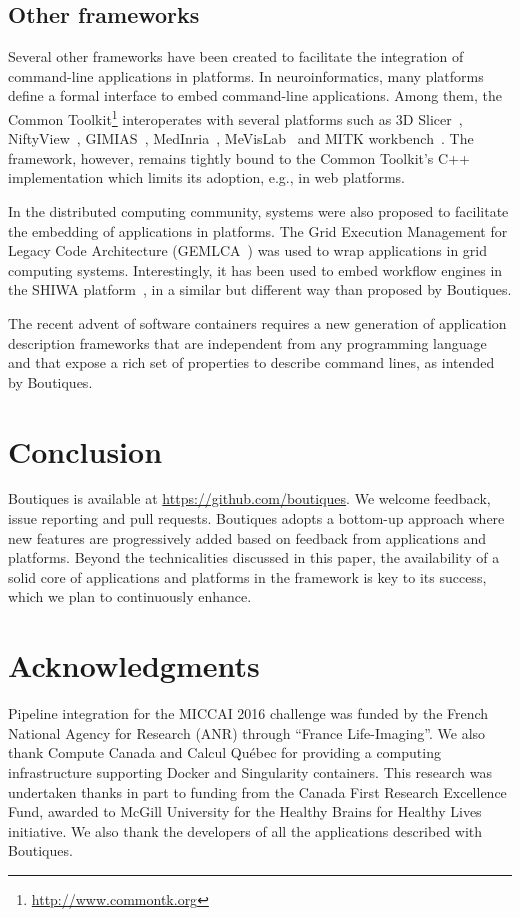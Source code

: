 \documentclass[a4paper,num-refs]{oup-contemporary}
\newcommand{\boutiques}{Boutiques\xspace}
\begin{document}
\subsection{Other frameworks}

Several other frameworks have been created to facilitate the
integration of command-line applications in platforms. In
neuroinformatics, many platforms define a formal interface to embed
command-line applications. Among them, the Common
Toolkit\footnote{\url{http://www.commontk.org}} interoperates with
several platforms such as 3D Slicer~\cite{pieper20043d},
NiftyView~\cite{Craddock2016}, GIMIAS~\cite{larrabide2009gimias},
MedInria~\cite{larrabide2009gimias}, MeVisLab~\cite{heckel2009object}
and MITK workbench~\cite{nolden2013medical}. The framework, however,
remains tightly bound to the Common Toolkit's C++ implementation which
limits its adoption, e.g., in web platforms.

In the distributed computing community, systems were also proposed to
facilitate the embedding of applications in platforms. The Grid
Execution Management for Legacy Code Architecture
(GEMLCA~\cite{delaitre2005gemlca}) was used to wrap applications in
grid computing systems. Interestingly, it has been used to embed
workflow engines in the SHIWA
platform~\cite{terstyanszky2014enabling}, in a similar but different
way than proposed by \boutiques.

The recent advent of software containers requires a new generation of
application description frameworks that are independent from any
programming language and that expose a rich set of properties to
describe command lines, as intended by \boutiques.

\section{Conclusion}

\boutiques is available at \url{https://github.com/boutiques}. We
welcome feedback, issue reporting and pull requests. \boutiques adopts
a bottom-up approach where new features are progressively added based
on feedback from applications and platforms. Beyond the technicalities
discussed in this paper, the availability of a solid core of
applications and platforms in the framework is key to its success,
which we plan to continuously enhance.

\section{Acknowledgments}

Pipeline integration for the MICCAI 2016 challenge was funded by the
French National Agency for Research (ANR) through ``France
Life-Imaging''. We also thank Compute Canada and Calcul Québec for
providing a computing infrastructure supporting Docker and Singularity
containers. This research was undertaken thanks in part to funding
from the Canada First Research Excellence Fund, awarded to McGill
University for the Healthy Brains for Healthy Lives initiative. We also
thank the developers of all the applications described with \boutiques.


\end{document}
